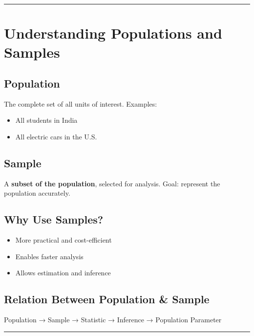 \documentclass[
  letterpaper,
  DIV=11,
  numbers=noendperiod]{scrreprt}
\providecommand{\tightlist}{%
  \setlength{\itemsep}{0pt}\setlength{\parskip}{0pt}}
\begin{document}
\begin{center}\rule{0.5\linewidth}{0.5pt}\end{center}

\section{Understanding Populations and
Samples}\label{understanding-populations-and-samples}

\subsection{Population}\label{population}

The complete set of all units of interest. Examples:

\begin{itemize}
\tightlist
\item
  All students in India
\item
  All electric cars in the U.S.
\end{itemize}

\subsection{Sample}\label{sample}

A \textbf{subset of the population}, selected for analysis. Goal:
represent the population accurately.

\subsection{Why Use Samples?}\label{why-use-samples}

\begin{itemize}
\tightlist
\item
  More practical and cost-efficient
\item
  Enables faster analysis
\item
  Allows estimation and inference
\end{itemize}

\subsection{Relation Between Population \&
Sample}\label{relation-between-population-sample}

Population → Sample → Statistic → Inference → Population Parameter

\begin{center}\rule{0.5\linewidth}{0.5pt}\end{center}
\end{document}
